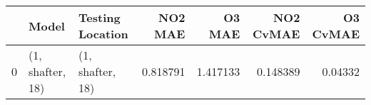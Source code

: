 \begin{tabular}{lllrrrr}
\toprule
{} &             Model &  Testing Location &   NO2 MAE &    O3 MAE &  NO2 CvMAE &  O3 CvMAE \\
\midrule
0 &  (1, shafter, 18) &  (1, shafter, 18) &  0.818791 &  1.417133 &   0.148389 &   0.04332 \\
\bottomrule
\end{tabular}
